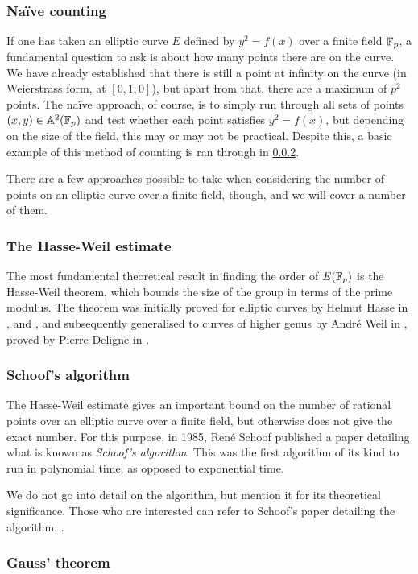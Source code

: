 \subsubsection{Naïve counting}
If one has taken an elliptic curve $E$ defined by $y^2 = f(x)$ over a finite field $\fp$, a fundamental question to ask is about how many points there are on the curve.
We have already established that there is still a point at infinity on the curve (in Weierstrass form, at $[0,1,0]$), but apart from that, there are a maximum of $p^2$ points.
The naïve approach, of course, is to simply run through all sets of points $(x,y) \in \an[2](\fp)$ and test whether each point satisfies $y^2 = f(x)$, but depending on the size of the field, this may or may not be practical.
Despite this, a basic example of this method of counting is ran through in \cref{hasseweil}.

There are a few approaches possible to take when considering the number of points on an elliptic curve over a finite field, though, and we will cover a number of them.
\subsubsection{The Hasse-Weil estimate}
\label{hasseweil}
The most fundamental theoretical result in finding the order of $E(\fp)$ is the Hasse-Weil theorem, which bounds the size of the group in terms of the prime modulus.
The theorem was initially proved for elliptic curves by Helmut Hasse in \cite{hasse1936a}, \cite{hasse1936b} and \cite{hasse1936c}, and subsequently generalised to curves of higher genus by André Weil in \cite{weil1948}, proved by Pierre Deligne in \cite{deligne1974}.

\subsubsection{Schoof's algorithm}
The Hasse-Weil estimate gives an important bound on the number of rational points over an elliptic curve over a finite field, but otherwise does not give the exact number.
For this purpose, in 1985, René Schoof published a paper detailing what is known as \emph{Schoof's algorithm}.
This was the first algorithm of its kind to run in polynomial time, as opposed to exponential time.

We do not go into detail on the algorithm, but mention it for its theoretical significance.
Those who are interested can refer to Schoof's paper detailing the algorithm, \cite{schoof1995}.
\subsubsection{Gauss' theorem}

